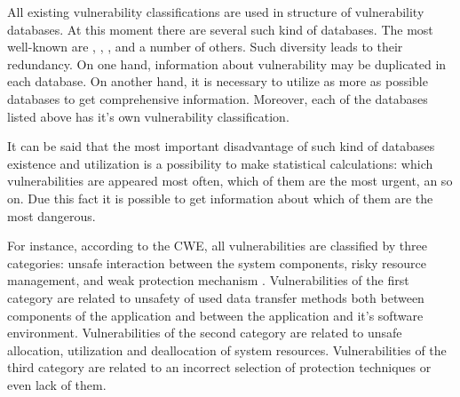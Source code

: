 

%
All existing vulnerability classifications are used in structure of vulnerability databases. 
%
At this moment there are several such kind of databases. 
%
The most well-known are  ,  ,  , and a number of others. 
%
Such diversity leads to their redundancy. 
%
On one hand, information about vulnerability may be duplicated in each database. 
%
On another hand, it is necessary to utilize as more as possible databases to get comprehensive information. 
%
Moreover, each of the databases listed above has it's own vulnerability classification. 

%
It can be said that the most important disadvantage of such kind of databases existence and utilization is a possibility to make statistical calculations: which vulnerabilities are appeared most often, which of them are the most urgent, an so on. 
%
Due this fact it is possible to get information about which of them are the most dangerous. 

%
For instance, according to the CWE, all vulnerabilities are classified by three categories: unsafe interaction between the system components, risky resource management, and weak protection mechanism . 
%
Vulnerabilities of the first category are related to unsafety of used data transfer methods both between components of the application and between the application and it's software environment. 
%
Vulnerabilities of the second category are related to unsafe allocation, utilization and deallocation of system resources. 
%
Vulnerabilities of the third category are related to an incorrect selection of protection techniques or even lack of them. 